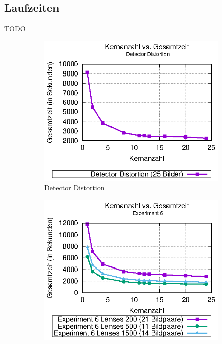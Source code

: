 \subsection{Laufzeiten}

\begin{correctmore}
	TODO
\end{correctmore}

\begin{center}
\begin{figure}[htbp]
	\begin{subfigure}[b]{0.325\textwidth}
		\centering
		\includegraphics[width=\textwidth]{pdf/times_detector_distortion}
		\caption[Detector Distortion]{Detector Distortion}
		\label{fig:times_det_dist}
	\end{subfigure}
	\hfill
	\begin{subfigure}[b]{0.325\textwidth}
		\centering
		\includegraphics[width=\textwidth]{pdf/times_exp6}

\end{subfigure}
\end{figure}
\end{center}
